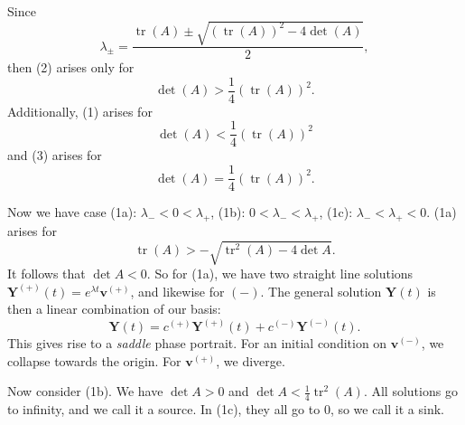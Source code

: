 Since
\[
	\lambda_\pm = \frac{\operatorname{tr}(A) \pm \sqrt{\left( \operatorname{tr}(A)  \right) ^2-4\det (A)} }{2}
,\]
then (2) arises only for
\[
	\det (A) > \frac{1}{4}\left( \operatorname{tr}(A)  \right) ^2
.\]
Additionally, (1) arises for
\[
	\det (A) < \frac{1}{4}\left( \operatorname{tr}(A)  \right) ^2
\]
and (3) arises for
\[
	\det (A)=\frac{1}{4}\left( \operatorname{tr}(A)  \right) ^2
.\]

Now we have case (1a): $\lambda_- < 0 < \lambda_+$, (1b): $0<\lambda_-<\lambda_+$, (1c): $\lambda _- < \lambda _+ < 0$. (1a) arises for
\[
	\operatorname{tr}(A) >-\sqrt{\operatorname{tr}^2(A)-4\det A } 
.\]
It follows that $\det A<0$. So for (1a), we have two straight line solutions $\mathbf{Y}^{(+)}(t)=e^{\lambda t}\mathbf{v}^{(+)}$, and likewise for $(-)$. The general solution $\mathbf{Y}(t)$ is then a linear combination of our basis:
\[
	\mathbf{Y}(t)=c^{(+)}\mathbf{Y}^{(+)}(t)+c^{(-)}\mathbf{Y}^{(-)}(t)
.\]
This gives rise to a \emph{saddle} phase portrait. For an initial condition on $\mathbf{v}^{(-)}$, we collapse towards the origin. For $\mathbf{v}^{(+)}$, we diverge.

Now consider (1b). We have $\det A>0$ and $\det A<\frac{1}{4}\operatorname{tr}^2(A) $. All solutions go to infinity, and we call it a source. In (1c), they all go to 0, so we call it a sink. 
